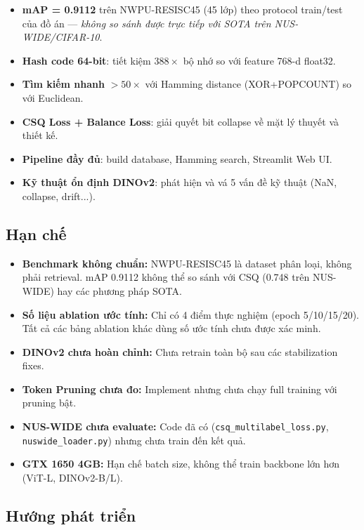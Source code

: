 \documentclass[13pt,a4paper]{article}
\begin{document}
\begin{itemize}
    \item \textbf{mAP = 0.9112} trên NWPU-RESISC45 (45 lớp) theo protocol train/test của đồ án --- \textit{không so sánh được trực tiếp với SOTA trên NUS-WIDE/CIFAR-10}.
    \item \textbf{Hash code 64-bit}: tiết kiệm $388\times$ bộ nhớ so với feature 768-d float32.
    \item \textbf{Tìm kiếm nhanh} $>50\times$ với Hamming distance (XOR+POPCOUNT) so với Euclidean.
    \item \textbf{CSQ Loss + Balance Loss}: giải quyết bit collapse về mặt lý thuyết và thiết kế.
    \item \textbf{Pipeline đầy đủ}: build database, Hamming search, Streamlit Web UI.
    \item \textbf{Kỹ thuật ổn định DINOv2}: phát hiện và vá 5 vấn đề kỹ thuật (NaN, collapse, drift...).
\end{itemize}

\subsection{Hạn chế}

\begin{itemize}
    \item \textbf{Benchmark không chuẩn:} NWPU-RESISC45 là dataset phân loại, không phải retrieval. mAP 0.9112 không thể so sánh với CSQ (0.748 trên NUS-WIDE) hay các phương pháp SOTA.
    \item \textbf{Số liệu ablation ước tính:} Chỉ có 4 điểm thực nghiệm (epoch 5/10/15/20). Tất cả các bảng ablation khác dùng số ước tính chưa được xác minh.
    \item \textbf{DINOv2 chưa hoàn chỉnh:} Chưa retrain toàn bộ sau các stabilization fixes.
    \item \textbf{Token Pruning chưa đo:} Implement nhưng chưa chạy full training với pruning bật.
    \item \textbf{NUS-WIDE chưa evaluate:} Code đã có (\texttt{csq\_multilabel\_loss.py}, \texttt{nuswide\_loader.py}) nhưng chưa train đến kết quả.
    \item \textbf{GTX 1650 4GB:} Hạn chế batch size, không thể train backbone lớn hơn (ViT-L, DINOv2-B/L).
\end{itemize}

\subsection{Hướng phát triển}
\end{document}

